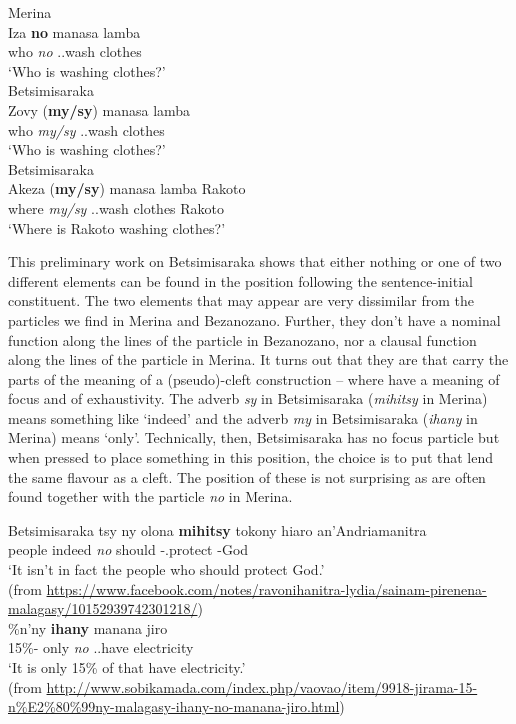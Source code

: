 \documentclass[output=paper]{langsci/langscibook}
\begin{document}
\ea
    \ea Merina\\
    \gll Iza \textbf{no} manasa lamba\\
    who \emph{no} \Prs.\At{}.wash clothes\\
    \glt `Who is washing clothes?'\\
    \ex Betsimisaraka\\
    \gll Zovy (\textbf{my/sy}) manasa lamba\\
    who \emph{my/sy} \Prs.\At{}.wash clothes\\
    \glt `Who is washing clothes?'\\
    \ex Betsimisaraka\\
    \gll Akeza (\textbf{my/sy}) manasa lamba Rakoto\\
    where \emph{my/sy} \Prs.\At{}.wash clothes Rakoto\\
    \glt `Where is Rakoto washing clothes?'\\
    \z
\z

This preliminary work on Betsimisaraka shows that either nothing or one of two
different elements can be found in the position following the sentence-initial
constituent.  The two elements that may appear are very dissimilar from the
particles we find in Merina and Bezanozano.  Further, they don't have a nominal
function along the lines of the particle in Bezanozano, nor a clausal function
along the lines of the particle in Merina.  It turns out that they are 
that carry the parts of the meaning of a (pseudo)-cleft construction -- where
 have a meaning of focus and of exhaustivity.  The adverb
\emph{sy} in Betsimisaraka (\emph{mihitsy} in Merina) means something like
`indeed' and the adverb \emph{my} in Betsimisaraka (\emph{ihany} in Merina)
means `only'.   Technically, then, Betsimisaraka has no focus particle but when
pressed to place something in this position, the choice is to put  that
lend the same flavour as a cleft.  The position of these  is not
surprising as  are often found together with the particle \emph{no} in
Merina.

\ea Betsimisaraka
    \ea
    \gll tsy ny olona \textbf{mihitsy}  tokony hiaro an'Andriamanitra\\
    \Neg{} \Det{} people indeed \emph{no} should \Fut{}-\At{}.protect \Acc{}-God\\
    \glt `It isn't in fact the people who should protect God.' \\
    (from \url{https://www.facebook.com/notes/ravonihanitra-lydia/sainam-pirenena-malagasy/10152939742301218/})\\
    \ex
    \%n'ny  \textbf{ihany}  manana jiro\\
    15\%-\Gen{}  only \emph{no} \Prs.\At.have electricity\\
    \glt `It is only 15\% of  that have electricity.'\\
    (from
    \url{http://www.sobikamada.com/index.php/vaovao/item/9918-jirama-15-n\%E2\%80\%99ny-malagasy-ihany-no-manana-jiro.html})
    \z
\z
\end{document}
